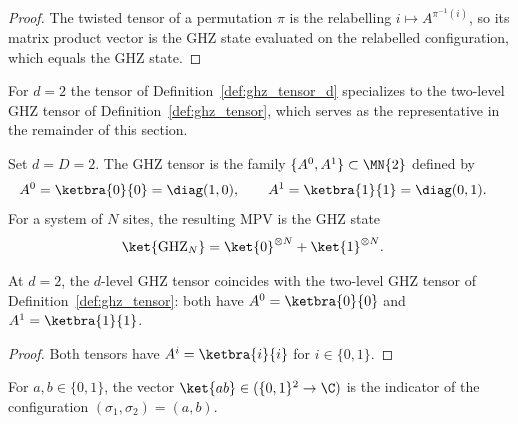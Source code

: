 \begin{proof}
    \leanok
    The twisted tensor of a permutation $\pi$ is the relabelling
    $i\mapsto A^{\pi^{-1}(i)}$, so its matrix product vector is the GHZ state
    evaluated on the relabelled configuration, which equals the GHZ state.
\end{proof}

For $d=2$ the tensor of Definition~\ref{def:ghz_tensor_d} specializes to the
two-level GHZ tensor of Definition~\ref{def:ghz_tensor}, which serves as the
representative in the remainder of this section.

\begin{definition}\label{def:ghz_tensor}
    \leanok
    Set $d = D = 2$. The GHZ tensor is the family
    $\{A^0, A^1\} \subset \MN{2}$ defined by
    \begin{align}
        A^0 & = \ketbra{0}{0} = \diag(1,0),
        \qquad
        A^1 = \ketbra{1}{1} = \diag(0,1).
        \notag
    \end{align}
    For a system of $N$ sites, the resulting MPV is the GHZ state
    \begin{align}
        \ket{\mathrm{GHZ}_N}
         & = \ket{0}^{\otimes N} + \ket{1}^{\otimes N}.
        \notag
    \end{align}
\end{definition}

\begin{lemma}\label{lem:ghz_tensor_d_two}
    \leanok
    At $d=2$, the $d$-level GHZ tensor coincides with the two-level GHZ tensor of
    Definition~\ref{def:ghz_tensor}: both have $A^0=\ketbra{0}{0}$ and
    $A^1=\ketbra{1}{1}$.
\end{lemma}

\begin{proof}
    \leanok
    Both tensors have $A^i=\ketbra{i}{i}$ for $i\in\{0,1\}$.
\end{proof}

\begin{definition}\label{def:two_site_ket}
    \leanok
    For $a,b\in\{0,1\}$, the vector
    $\ket{ab}\in(\{0,1\}^{2}\to\C)$ is the indicator of the configuration
    $(\sigma_1,\sigma_2)=(a,b)$.
\end{definition}

